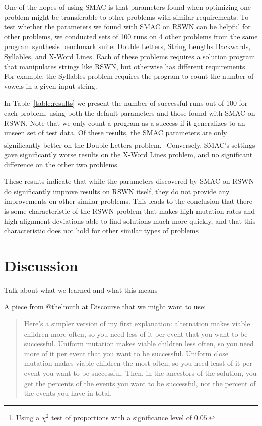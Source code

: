 One of the hopes of using SMAC is that parameters found when optimizing one problem might be transferable to other problems with similar requirements. To test whether the parameters we found with SMAC on RSWN can be helpful for other problems, we conducted sets of 100 runs on 4 other problems from the same program synthesis benchmark suite: Double Letters, String Lengths Backwards, Syllables, and X-Word Lines. Each of these problems requires a solution program that manipulates strings like RSWN, but otherwise has different requirements. For example, the Syllables problem requires the program to count the number of vowels in a given input string.

In Table~\ref{table:results} we present the number of successful runs out of 100 for each problem, using both the default parameters and those found with SMAC on RSWN. Note that we only count a program as a success if it generalizes to an unseen set of test data. Of these results, the SMAC parameters are only significantly better on the Double Letters problem.\footnote{Using a $\chi^2$ test of proportions with a significance level of $0.05$.} 
Conversely, SMAC's settings gave significantly worse results on the X-Word Lines problem, and no significant difference on the other two problems.

These results indicate that while the parameters discovered by SMAC on RSWN do significantly improve results on RSWN itself, they do not provide any improvements on other similar problems. This leads to the conclusion that there is some characteristic of the RSWN problem that makes high mutation rates and high alignment deviations able to find solutions much more quickly, and that this characteristic does not hold for other similar types of problems


\section{Discussion}
\label{sec:discussion}

Talk about what we learned and what this means

A piece from @thelmuth at Discourse that we might want to use:
\begin{quote}
	Here's a simpler version of my first explanation: alternation makes viable children more often, so you need less of it per event that you want to be successful. Uniform mutation makes viable children less often, so you need more of it per event that you want to be successful. Uniform close mutation makes viable children the most often, so you need least of it per event you want to be successful. Then, in the ancestors of the solution, you get the percents of the events you want to be successful, not the percent of the events you have in total.
\end{quote}

